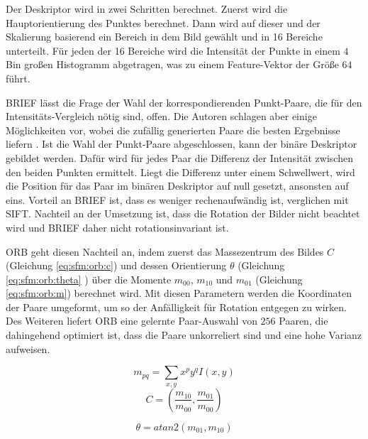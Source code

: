 \documentclass[12pt,titlepage, twoside]{article}
\begin{document}
Der Deskriptor wird in zwei Schritten berechnet. Zuerst wird die Hauptorientierung des Punktes berechnet. Dann wird auf dieser und der Skalierung basierend ein Bereich in dem Bild gewählt und in 16 Bereiche unterteilt.
Für jeden der 16 Bereiche wird die Intensität der Punkte in einem $4$ Bin großen Histogramm abgetragen, was zu einem Feature-Vektor der Größe $64$ führt.

BRIEF \cite{BRIEF} lässt die Frage der Wahl der korrespondierenden Punkt-Paare, die für den Intensitäts-Vergleich nötig sind, offen. 
Die Autoren schlagen aber einige Möglichkeiten vor, wobei die zufällig generierten Paare die besten Ergebnisse liefern \cite{BRIEF}.
Ist die Wahl der Punkt-Paare abgeschlossen, kann der binäre Deskriptor gebildet werden. Dafür wird für jedes Paar die Differenz der Intensität zwischen den beiden Punkten ermittelt. 
Liegt die Differenz unter einem Schwellwert, wird die Position für das Paar im binären Deskriptor auf null gesetzt, ansonsten auf eins.
Vorteil an BRIEF ist, dass es weniger rechenaufwändig ist, verglichen mit SIFT. Nachteil an der Umsetzung ist, dass die Rotation der Bilder nicht beachtet wird und BRIEF daher nicht rotationsinvariant ist.

ORB \cite{ORB} geht diesen Nachteil an, indem zuerst das Massezentrum des Bildes $C$ (Gleichung \ref{eq:sfm:orb:c}) und dessen Orientierung $\theta$ (Gleichung \ref{eq:sfm:orb:theta} )
über die Momente $m_{00}$, $m_{10}$ und $m_{01}$ (Gleichung \ref{eq:sfm:orb:m}) berechnet wird.
Mit diesen Parametern werden die Koordinaten der Paare umgeformt, um so der Anfälligkeit für Rotation entgegen zu wirken. 
Des Weiteren liefert ORB eine gelernte Paar-Auswahl von $256$ Paaren, die dahingehend optimiert ist, dass die Paare unkorreliert sind und eine hohe Varianz aufweisen.

\begin{equation}
    \label{eq:sfm:orb:m}
    m_{pq} = \sum_{x,y}{x^py^qI(x,y)}
\end{equation}
\begin{equation}
    \label{eq:sfm:orb:c}
    C = ( \frac{m_{10}}{m_{00}}, \frac{m_{01}}{m_{00}} )
\end{equation}

\begin{equation}
    \label{eq:sfm:orb:theta}
    \theta = atan2(m_{01},m_{10})
\end{equation}
\end{document}
